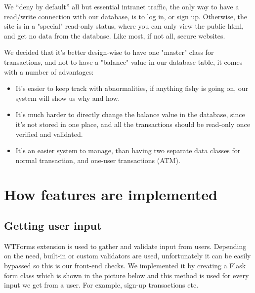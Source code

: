 We “deny by default” all but essential intranet traffic, the only way to have a read/write connection with our database, is to log in, or sign up.
Otherwise, the site is in a "special" read-only status, where you can only view the public html, and get no data from the database. Like most, if not all, secure websites.

We decided that it's better design-wise to have one "master" class for transactions, and not to have a "balance" value in our database table, it comes with a number of advantages:
\begin{itemize}
    \item It's easier to keep track with abnormalities, if anything fishy is going on, our system will show us why and how.
    \item It's much harder to directly change the balance value in the database, since it's not stored in one place, and all the transactions should be read-only once verified and validated.
    \item It's an easier system to manage, than having two separate data classes for normal transaction, and one-user transactions (ATM).
\end{itemize}


\section{How features are implemented}

\subsection{Getting user input}

WTForms extension is used to gather and validate input from users. Depending on the need, built-in or custom validators are used, unfortunately it can be easily bypassed so this is our front-end checks. We implemented it by  creating a Flask form class which is shown in the picture below and this method is used for every input we get from a user. For example, sign-up transactions etc. 

